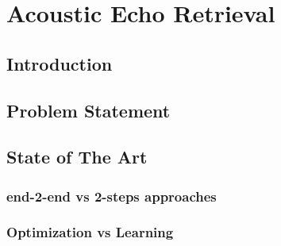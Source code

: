 \chapter{Acoustic Echo Retrieval}\label{chap:fundations}

\section{Introduction}
\blindtext[1]

\section{Problem Statement}
\section{State of The Art}
\subsection{end-2-end vs 2-steps approaches}
\subsection{Optimization vs Learning}


